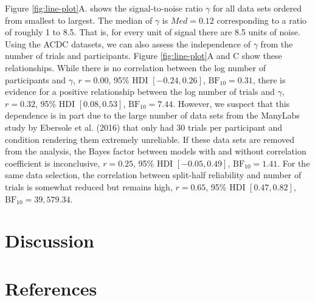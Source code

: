 \documentclass[
  man,floatsintext]{apa6}
\begin{document}
Figure \ref{fig:line-plot}A. shows the signal-to-noise ratio \(\gamma\) for all data sets ordered from smallest to largest. The median of \(\gamma\) is \(Med = 0.12\) corresponding to a ratio of roughly 1 to 8.5. That is, for every unit of signal there are 8.5 units of noise. Using the ACDC datasets, we can also assess the independence of \(\gamma\) from the number of trials and participants. Figure \ref{fig:line-plot}A and C show these relationships. While there is no correlation between the log number of participants and \(\gamma\), \(r = 0.00\), 95\% HDI \([-0.24, 0.26]\), \(\mathrm{BF}_{\textrm{10}} = 0.31\), there is evidence for a positive relationship between the log number of trials and \(\gamma\), \(r = 0.32\), 95\% HDI \([0.08, 0.53]\), \(\mathrm{BF}_{\textrm{10}} = 7.44\). However, we suspect that this dependence is in part due to the large number of data sets from the ManyLabs study by Ebersole et al. (2016) that only had 30 trials per participant and condition rendering them extremely unreliable. If these data sets are removed from the analysis, the Bayes factor between models with and without correlation coefficient is inconclusive, \(r = 0.25\), 95\% HDI \([-0.05, 0.49]\), \(\mathrm{BF}_{\textrm{10}} = 1.41\). For the same data selection, the correlation between split-half reliability and number of trials is somewhat reduced but remains high, \(r = 0.65\), 95\% HDI \([0.47, 0.82]\), \(\mathrm{BF}_{\textrm{10}} = 39,579.34\).

\hypertarget{discussion}{%
\section{Discussion}\label{discussion}}

\newpage

\hypertarget{references}{%
\section{References}\label{references}}
\end{document}
